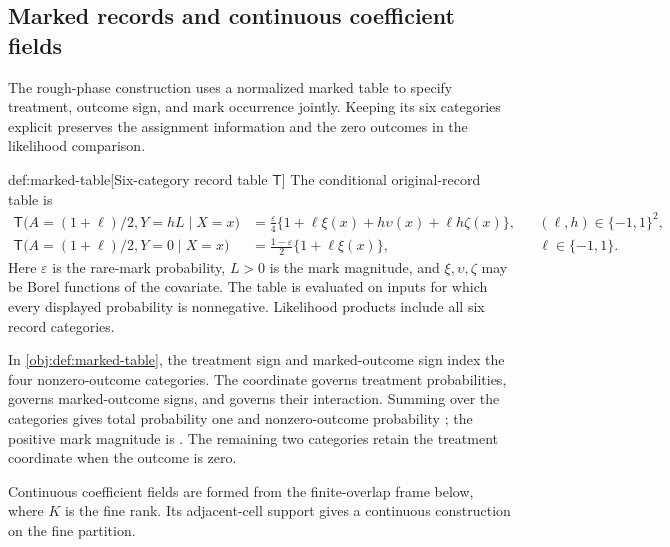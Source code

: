 \documentclass[11pt]{article}
\begin{document}
\subsection{Marked records and continuous coefficient fields}

The rough-phase construction uses a normalized marked table  to specify treatment, outcome sign, and mark occurrence jointly. Keeping its six categories explicit preserves the assignment information and the zero outcomes in the likelihood comparison.

\begin{definitionv}{def:marked-table}[Six-category record table \(\mathsf T\)]
The conditional original-record table is
\[
\begin{aligned}
\mathsf T\bigl(A=(1+\ell)/2,Y=hL\mid X=x\bigr)
&=\frac{\varepsilon}{4}
\{1+\ell\xi(x)+h\upsilon(x)+\ell h\zeta(x)\},
&&(\ell,h)\in\{-1,1\}^2,\\
\mathsf T\bigl(A=(1+\ell)/2,Y=0\mid X=x\bigr)
&=\frac{1-\varepsilon}{2}\{1+\ell\xi(x)\},
&&\ell\in\{-1,1\}.
\end{aligned}
\]
Here \(\varepsilon\) is the rare-mark probability, \(L>0\) is the mark magnitude, and \(\xi,\upsilon,\zeta\) may be Borel functions of the covariate. The table is evaluated on inputs for which every displayed probability is nonnegative. Likelihood products include all six record categories.
\end{definitionv}

In \cref{obj:def:marked-table}, the treatment sign  and marked-outcome sign  index the four nonzero-outcome categories. The coordinate  governs treatment probabilities,  governs marked-outcome signs, and  governs their interaction. Summing over the categories gives total probability one and nonzero-outcome probability ; the positive mark magnitude is . The remaining two categories retain the treatment coordinate when the outcome is zero.

Continuous coefficient fields are formed from the finite-overlap frame  below, where \(K\) is the fine rank. Its adjacent-cell support gives a continuous construction on the fine partition.
\end{document}
